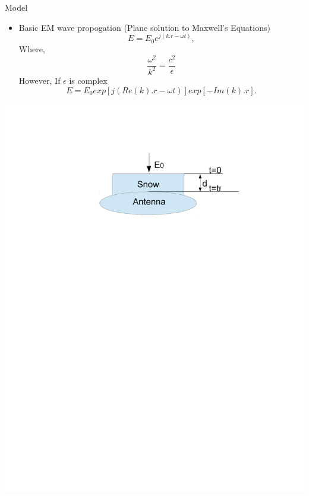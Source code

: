 \documentclass{beamer}
\begin{document}
\section[Model]{}
\begin{frame}{Model}
\begin{itemize}
\item Basic EM wave propogation (Plane solution to Maxwell's Equations)
  \begin{equation}
    E = E_0e^{j(k.r -\omega t)},
  \end{equation}
  Where,
  \begin{equation*}
    \frac{\omega^2}{k^2}=\frac{c^2}{\epsilon}
  \end{equation*}
  However, If $\epsilon$ is complex
  \begin{equation}
    E = E_0 exp[j (Re(k).r - \omega t)]exp[-Im(k).r].
  \end{equation}
\end{itemize}
\begin{center}
\includegraphics[width=0.8\linewidth,trim=100 100 100 100, clip=true]{model1.pdf}
\end{center}
\end{frame}
\end{document}
